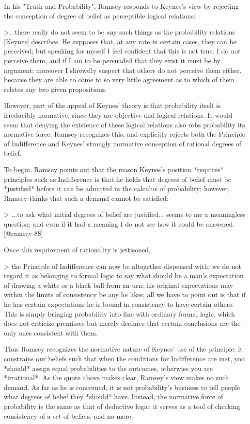 In his "Truth and Probability", Ramsey responds to Keynes's view by
rejecting the conception of degree of belief as perceptible logical
relations:

\textgreater{}...there really do not seem to be any such things as the
probability relations {[}Keynes{]} describes. He supposes that, at any
rate in certain cases, they can be perceived; but speaking for myself I
feel confident that this is not true. I do not perceive them, and if I
am to be persuaded that they exist it must be by argument; moreover I
shrewdly suspect that others do not perceive them either, because they
are able to come to so very little agreement as to which of them relates
any two given propositions.

However, part of the appeal of Keynes' theory is that probability itself
is irreducibly normative, since they are objective and logical
relations. It would seem that denying the existence of these logical
relations also robs probability its normative force. Ramsey recognizes
this, and explicitly rejects both the Principle of Indifference and
Keynes' strongly normative conception of rational degrees of belief.

To begin, Ramsey points out that the reason Keynes's position *requires*
principles such as Indifference is that he holds that degrees of belief
must be *justified* before it can be admitted in the calculus of
probability; however, Ramsey thinks that such a demand cannot be
satisfied:

\textgreater{} ...to ask what initial degrees of belief are justified...
seems to me a meaningless question; and even if it had a meaning I do
not see how it could be answered.{[}@ramsey 88{]}

Once this requirement of rationality is jettisoned,

\textgreater{} the Principle of Indifference can now be altogether
dispensed with; we do not regard it as belonging to formal logic to say
what should be a man's expectation of drawing a white or a black ball
from an urn; his original expectations may within the limits of
consistency be any he likes; all we have to point out is that if he has
certain expectations he is bound in consistency to have certain others.
This is simply bringing probability into line with ordinary formal
logic, which does not criticize premisses but merely declares that
certain conclusions are the only ones consistent with them.

Thus Ramsey recognizes the normative nature of Keynes' use of the
principle: it constrains our beliefs such that when the conditions for
Indifference are met, you *should* assign equal probabilities to the
outcomes, otherwise you are *irrational*. As the quote above makes
clear, Ramsey's view makes no such demand. As far as he is concerned, it
is not probability's business to tell people what degrees of belief they
*should* have. Instead, the normative force of probability is the same
as that of deductive logic: it serves as a tool of checking consistency
of a set of beliefs, and no more.

